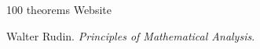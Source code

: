 \documentclass{article}
\begin{document}
\begin{thebibliography}{plain}
 100 theorems
 Website

 Walter Rudin. \textit{Principles of Mathematical
Analysis}.
\end{thebibliography}
\end{document}
